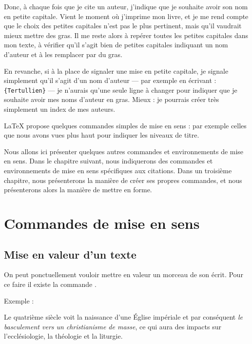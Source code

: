 Donc, à chaque fois que je cite un auteur, j'indique que je souhaite avoir son nom en petite capitale.
Vient le moment où j'imprime mon livre, et je me rend compte que le choix des petites capitales n'est pas le plus pertinent, mais qu'il vaudrait mieux mettre des gras. Il me reste alors à repérer toutes les petites capitales dans mon texte, à vérifier qu'il s'agit bien de petites capitales indiquant un nom d'auteur et à les remplacer par du gras.

En revanche, si à la place de signaler une mise en petite capitale, je signale simplement  qu'il s'agit d'un nom d'auteur --- par exemple en écrivant : \verb|{Tertullien}| --- je n'aurais qu'une seule ligne à changer pour indiquer que je souhaite avoir mes noms d'auteur en gras. Mieux : je pourrais créer très simplement un index de mes auteurs.

LaTeX propose quelques commandes simples de mise en sens  : par exemple celles que nous avons vues plus haut pour indiquer les niveaux de titre.

Nous allons ici présenter quelques autres commandes et environnements de mise en sens. Dans le chapitre suivant, nous indiquerons des commandes et environnements de mise en sens spécifiques aux citations. Dans un troisième chapitre, nous présenterons la manière de créer ses propres commandes, et nous présenterons alors la manière de mettre en forme.

\section{Commandes de mise en sens}

\subsection{Mise en valeur d'un texte}

On peut ponctuellement vouloir mettre en valeur un morceau de son écrit. Pour ce faire il existe la commande .

Exemple :

\begin{latexcode}
Le quatrième siècle voit la naissance d'une Église impériale
et par conséquent \emph{le basculement vers un christianisme
de masse},
ce qui aura des impacts sur l'ecclésiologie,
 la théologie et la liturgie.
\end{latexcode}

